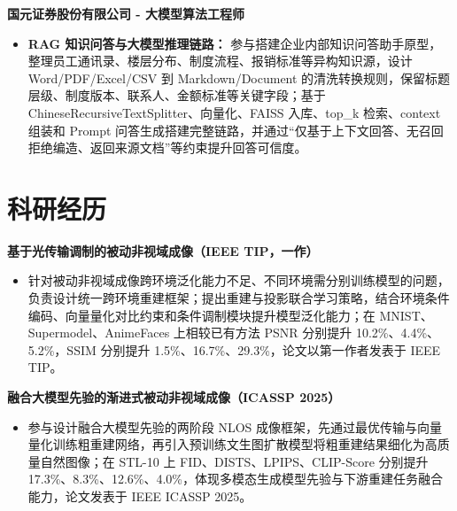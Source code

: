 \documentclass[fontset=none,a4paper,10pt]{ctexart}
\newcommand{\resumeItem}[2]{
  {
    {\fontsize{9.8pt}{10.2pt}\selectfont\textbf{#1}}{ #2 \vspace{0pt}}
  }
}
\newcommand{\resumeSubItem}[2]{\resumeItem{#1}{#2}\vspace{0pt}}
\begin{document}
\resumeSubItem{国元证券股份有限公司 - 大模型算法工程师}\hfill{2023.08 -- 2023.10}
\begin{itemize}[leftmargin=*, itemsep=1.3pt, topsep=4pt]
\item \textbf{RAG 知识问答与大模型推理链路：} 参与搭建企业内部知识问答助手原型，整理员工通讯录、楼层分布、制度流程、报销标准等异构知识源，设计 Word/PDF/Excel/CSV 到 Markdown/Document 的清洗转换规则，保留标题层级、制度版本、联系人、金额标准等关键字段；基于 ChineseRecursiveTextSplitter、向量化、FAISS 入库、top\_k 检索、context 组装和 Prompt 问答生成搭建完整链路，并通过“仅基于上下文回答、无召回拒绝编造、返回来源文档”等约束提升回答可信度。
\end{itemize}

\vspace{-1pt}
\section{科研经历}
\resumeSubItem{基于光传输调制的被动非视域成像（IEEE TIP，一作）}\hfill{2022.09 -- 2023.05}
\begin{itemize}[leftmargin=*, itemsep=0pt, topsep=-1pt]
\item 针对被动非视域成像跨环境泛化能力不足、不同环境需分别训练模型的问题，负责设计统一跨环境重建框架；提出重建与投影联合学习策略，结合环境条件编码、向量量化对比约束和条件调制模块提升模型泛化能力；在 MNIST、Supermodel、AnimeFaces 上相较已有方法 PSNR 分别提升 10.2\%、4.4\%、5.2\%，SSIM 分别提升 1.5\%、16.7\%、29.3\%，论文以第一作者发表于 IEEE TIP。
\end{itemize}
\vspace{4pt}
\resumeSubItem{融合大模型先验的渐进式被动非视域成像（ICASSP 2025）}\hfill{2022.09 -- 2024.02}
\begin{itemize}[leftmargin=*, itemsep=0pt, topsep=-1pt]
\item 参与设计融合大模型先验的两阶段 NLOS 成像框架，先通过最优传输与向量量化训练粗重建网络，再引入预训练文生图扩散模型将粗重建结果细化为高质量自然图像；在 STL-10 上 FID、DISTS、LPIPS、CLIP-Score 分别提升 17.3\%、8.3\%、12.6\%、4.0\%，体现多模态生成模型先验与下游重建任务融合能力，论文发表于 IEEE ICASSP 2025。
\end{itemize}

\vspace{-1pt}
\end{document}

